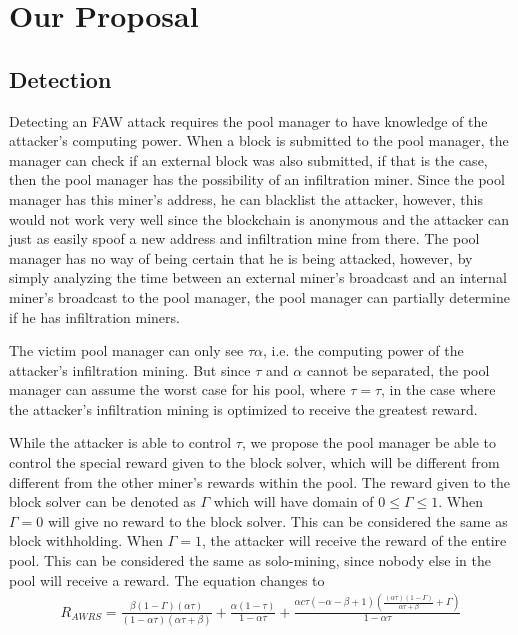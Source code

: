 \documentclass[runningheads]{llncs}
\begin{document}
\section{Our Proposal}
\subsection{Detection}
Detecting an FAW attack requires the pool manager to have knowledge of the attacker's computing power. When a block is submitted to the pool manager, the manager can check if an external block was also submitted, if that is the case, then the pool manager has the possibility of an infiltration miner. Since the pool manager has this miner's address, he can blacklist the attacker, however, this would not work very well since the blockchain is anonymous and the attacker can just as easily spoof a new address and infiltration mine from there. The pool manager has no way of being certain that he is being attacked, however, by simply analyzing the time between an external miner's broadcast and an internal miner's broadcast to the pool manager, the pool manager can partially determine if he has infiltration miners.

The victim pool manager can only see $\tau \alpha$, i.e. the computing power of the attacker's infiltration mining. But since $\tau$ and $\alpha$ cannot be separated, the pool manager can assume the worst case for his pool, where $\tau=\hat{\tau}$,  in the case where the attacker's infiltration mining is optimized to receive the greatest reward. 

While the attacker is able to control $\tau$, we propose the pool manager be able to control the special reward given to the block solver, which will be different from different from the other miner's rewards within the pool. The reward given to the block solver can be denoted as $\Gamma$ which will have domain of $0\leq\Gamma\leq1$. When $\Gamma=0$ will give no reward to the block solver. This can be considered the same as block withholding. When $\Gamma=1$, the attacker will receive the reward of the entire pool. This can be considered the same as solo-mining, since nobody else in the pool will receive a reward. The equation changes to
\begin{eqnarray}
R_{AWRS}=\frac{\beta  (1-\Gamma ) (\alpha  \tau )}{(1-\alpha  \tau ) (\alpha  \tau +\beta )}+\frac{\alpha  (1-\tau )}{1-\alpha  \tau }+\frac{\alpha  c \tau  (-\alpha -\beta +1) \left(\frac{(\alpha  \tau ) (1-\Gamma )}{\alpha  \tau +\beta }+\Gamma \right)}{1-\alpha  \tau }
\end{eqnarray}
\end{document}
